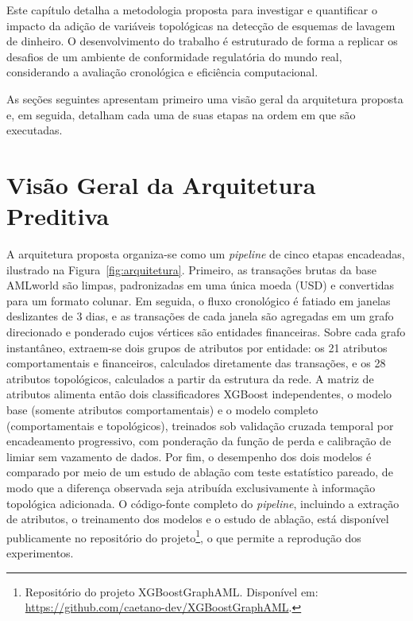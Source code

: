 \documentclass[titlepage,a4paper,oneside,onecolumn,12pt]{report}
\begin{document}
Este capítulo detalha a metodologia proposta para investigar e quantificar o impacto da adição de variáveis topológicas na detecção de esquemas de lavagem de dinheiro. O desenvolvimento do trabalho é estruturado de forma a replicar os desafios de um ambiente de conformidade regulatória do mundo real, considerando a avaliação cronológica e eficiência computacional.

As seções seguintes apresentam primeiro uma visão geral da arquitetura proposta e, em seguida, detalham cada uma de suas etapas na ordem em que são executadas.

\section*{Visão Geral da Arquitetura Preditiva}

A arquitetura proposta organiza-se como um \textit{pipeline} de cinco etapas encadeadas, ilustrado na Figura~\ref{fig:arquitetura}. Primeiro, as transações brutas da base AMLworld são limpas, padronizadas em uma única moeda (USD) e convertidas para um formato colunar. Em seguida, o fluxo cronológico é fatiado em janelas deslizantes de 3 dias, e as transações de cada janela são agregadas em um grafo direcionado e ponderado cujos vértices são entidades financeiras. Sobre cada grafo instantâneo, extraem-se dois grupos de atributos por entidade: os 21 atributos comportamentais e financeiros, calculados diretamente das transações, e os 28 atributos topológicos, calculados a partir da estrutura da rede. A matriz de atributos alimenta então dois classificadores XGBoost independentes, o modelo base (somente atributos comportamentais) e o modelo completo (comportamentais e topológicos), treinados sob validação cruzada temporal por encadeamento progressivo, com ponderação da função de perda e calibração de limiar sem vazamento de dados. Por fim, o desempenho dos dois modelos é comparado por meio de um estudo de ablação com teste estatístico pareado, de modo que a diferença observada seja atribuída exclusivamente à informação topológica adicionada. O código-fonte completo do \textit{pipeline}, incluindo a extração de atributos, o treinamento dos modelos e o estudo de ablação, está disponível publicamente no repositório do projeto\footnote{Repositório do projeto XGBoostGraphAML. Disponível em: \url{https://github.com/caetano-dev/XGBoostGraphAML}.}, o que permite a reprodução dos experimentos.
\end{document}
